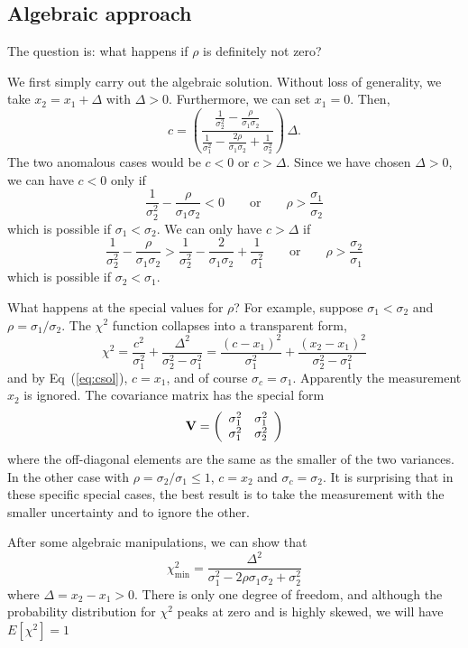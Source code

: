 \documentclass[11pt]{article}
\newcommand{\chisqmin} {\chi^2_{\mathrm{min}}}
\newcommand{\xa}   {x_1}
\newcommand{\xb}   {x_2}
\newcommand{\ua} {\sigma_{1}}
\newcommand{\ub} {\sigma_{2}}
\newcommand{\uc} {\sigma_{c}}
\newcommand{\uaq} {\sigma^2_{1}}
\newcommand{\ubq} {\sigma^2_{2}}
\begin{document}
\subsection{Algebraic approach}
\par
The question is: what happens if $\rho$ is definitely not zero?
\par
We first simply carry out the algebraic solution.
Without loss of generality, we take $\xb =  \xa + \Delta$ with $\Delta > 0$.
Furthermore, we can set $\xa = 0$.  Then,
$$
 c = \left(
 \frac{ \frac{1}{\ubq}  - \frac{\rho}{\ua\ub} }
        {   \frac{1}{\uaq} - \frac{2\rho}{\ua\ub} + \frac{1}{\ubq}  }
        \right) \, \Delta .
$$
The two anomalous cases would be  $c < 0$ or $c > \Delta$.
Since we have chosen $\Delta > 0$, we can have $c < 0$ only if
$$
 \frac{1}{\ubq} - \frac{\rho}{\ua\ub} < 0
 \qquad {\mathrm{or}} \qquad
 \rho > \frac{\ua}{\ub}
$$
which is possible if $\ua < \ub$.
We can only have $c > \Delta$ if
$$
 \frac{1}{\ubq} - \frac{\rho}{\ua\ub} > \frac{1}{\ubq} - \frac{2}{\ua\ub} + \frac{1}{\uaq}
 \qquad {\mathrm{or}} \qquad
 \rho >  \frac{\ub}{\ua}
$$
which is possible if  $\ub < \ua$.
\par
What happens at the special values for $\rho$?
For example, suppose $\ua < \ub$ and $\rho = \ua/\ub$.  
The $\chi^2$ function collapses into a transparent form,
$$
 \chi^2 = \frac{c^2}{\uaq} + \frac{\Delta^2}{\ubq-\uaq}
  = \frac{(c-\xa)^2}{\uaq} + \frac{(\xb-\xa)^2}{\ubq-\uaq} 
$$
and by Eq~(\ref{eq:csol}), $c = \xa$, and of course $\uc = \ua$.
Apparently the measurement $\xb$ is ignored.  
The covariance matrix has the special form
$$
 {\mathbf{V}} =  
 \left( \begin{array}{cc}
   \uaq & \uaq \cr \uaq & \ubq \cr
          \end{array} \right) 
$$
where the off-diagonal elements are the same as the
smaller of the two variances.  In the other case with
$\rho = \ub/\ua \le 1$, $c = \xb$ and $\uc = \ub$.
It is surprising that in these specific special cases,
the best result is to take the measurement with the
smaller uncertainty and to ignore the other.
\par
After some algebraic manipulations, we can show that
\begin{equation}
\label{eq:chisqmin}
 \chisqmin = \frac{\Delta^2}{\uaq - 2\rho\ua\ub + \ubq} 
\end{equation}
where $\Delta = \xb - \xa > 0$.  There is only one degree of
freedom, and although the probability distribution for $\chi^2$
peaks at zero and is highly skewed, we will have $E[\chi^2] = 1$
\end{document}
